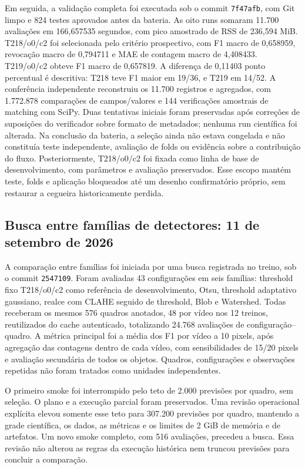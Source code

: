 Em seguida, a validação completa foi executada sob o commit \texttt{7f47afb}, com Git limpo e 824 testes aprovados antes da bateria. As oito runs somaram 11.700 avaliações em 166,657535 segundos, com pico amostrado de RSS de 236,594 MiB. T218/o0/c2 foi selecionada pelo critério prospectivo, com F1 macro de 0,658959, revocação macro de 0,794711 e MAE de contagem macro de 4,408433. T219/o0/c2 obteve F1 macro de 0,657819. A diferença de 0,11403 ponto percentual é descritiva: T218 teve F1 maior em 19/36, e T219 em 14/52. A conferência independente reconstruiu os 11.700 registros e agregados, com 1.772.878 comparações de campos/valores e 144 verificações amostrais de matching com SciPy. Duas tentativas iniciais foram preservadas após correções de suposições do verificador sobre formato de metadados; nenhuma run científica foi alterada. Na conclusão da bateria, a seleção ainda não estava congelada e não constituía teste independente, avaliação de folds ou evidência sobre a contribuição do fluxo. Posteriormente, T218/o0/c2 foi fixada como linha de base de desenvolvimento, com parâmetros e avaliação preservados. Esse escopo mantém teste, folds e aplicação bloqueados até um desenho confirmatório próprio, sem restaurar a cegueira historicamente perdida.

\subsection{Busca entre famílias de detectores: 11 de setembro de 2026}
\label{sec:busca-classicos-20260911}

A comparação entre famílias foi iniciada por uma busca registrada no treino, sob o commit \texttt{2547109}. Foram avaliadas 43 configurações em seis famílias: threshold fixo T218/o0/c2 como referência de desenvolvimento, Otsu, threshold adaptativo gaussiano, realce com CLAHE seguido de threshold, Blob e Watershed. Todas receberam os mesmos 576 quadros anotados, 48 por vídeo nos 12 treinos, reutilizados do cache autenticado, totalizando 24.768 avaliações de configuração--quadro. A métrica principal foi a média dos F1 por vídeo a 10 pixels, após agregação das contagens dentro de cada vídeo, com sensibilidades de 15/20 pixels e avaliação secundária de todos os objetos. Quadros, configurações e observações repetidas não foram tratados como unidades independentes.

O primeiro smoke foi interrompido pelo teto de 2.000 previsões por quadro, sem seleção. O plano e a execução parcial foram preservados. Uma revisão operacional explícita elevou somente esse teto para 307.200 previsões por quadro, mantendo a grade científica, os dados, as métricas e os limites de 2 GiB de memória e de artefatos. Um novo smoke completo, com 516 avaliações, precedeu a busca. Essa revisão não alterou as regras da execução histórica nem truncou previsões para concluir a comparação.

